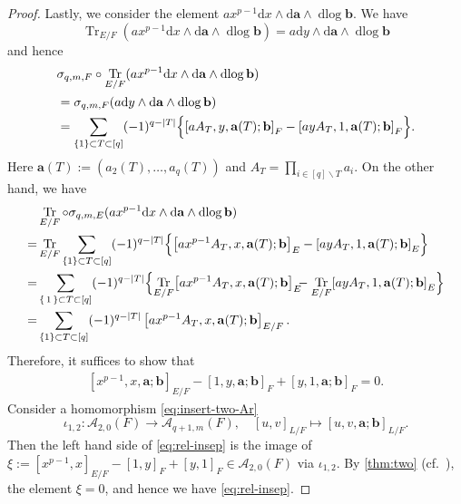 \documentclass[a4paper,12pt,reqno]{amsart}
\numberwithin{equation}{section}
\theoremstyle{definition}
\DeclareMathOperator{\dlog}{dlog}
\DeclareMathOperator{\Tr}{Tr}
\renewcommand{\d}{\mathrm{d}}
\newcommand{\Acal}{\mathcal{A}}
\newcommand{\va}{\mathbf{a}}
\newcommand{\vb}{\mathbf{b}}
\begin{document}
\begin{proof}
    Lastly, we consider the element $ax^{p-1}\d x\wedge \d \va\wedge\dlog\vb$.
    We have 
    \[
    \Tr_{E/F}(ax^{p-1}\d x\wedge \d \va\wedge\dlog\vb)=a\d y\wedge \d \va\wedge\dlog\vb
    \]
    and hence
    \begin{align}
        &\sigma_{q,m,F}\circ \Tr_{E/F}(ax^{p-1}\d x\wedge \d \va\wedge\dlog\vb)
        \\&=\sigma_{q,m,F}(a\d y\wedge \d \va\wedge\dlog\vb)\\
        &=\sum_{\{1\}\subset T\subset[q]}(-1)^{q-|T|}\Bigl\{
        \left[
        aA_T%
        ,y,\va(T);\vb
        \right]_F
        -
        \left[
        ayA_T%
        ,1,\va(T);\vb
        \right]_F 
         \Bigr\}.
    \end{align}
    Here $\va(T):=(a_2(T),\ldots,a_q(T))$ and $A_T=\prod_{i\in [q]\smallsetminus T}a_i$. 
    On the other hand, we have
    \begin{align}
        &\Tr_{E/F}\circ  \sigma_{q,m,E}(ax^{p-1}\d x \wedge \d\va \wedge \dlog \vb)\\
        =&\Tr_{E/F}\sum_{\{1\}\subset T\subset[q]}(-1)^{q-|T|}\Bigl\{
        \left[
        ax^{p-1}A_T%
        ,x,\va(T);\vb
        \right]_E 
        -
        \left[
        ayA_T%
        ,1,\va(T);\vb
        \right]_E 
         \Bigr\}\\
        =&\sum_{\set{1}\subset T\subset[q]}(-1)^{q-|T|}\Bigl\{
        \Tr_{E/F}\!\left[
        ax^{p-1}A_T%
        ,x,\va(T);\vb
        \right]_E\!\!\! 
        -
        \Tr_{E/F}\!\left[
        ayA_T%
        ,1,\va(T);\vb
        \right]_E 
         \Bigr\}\\
        =&\sum_{\{1\}\subset T\subset[q]}(-1)^{q-|T|}
        \left[
        ax^{p-1}A_T%
        ,x,\va(T);\vb
        \right]_{E/F}.
    \end{align}
    Therefore, it suffices to show that
    \begin{align}\label{eq:rel-insep}        
    [x^{p-1},x,\va;\vb]_{E/F}-[1,y,\va;\vb]_F+[y,1,\va;\vb]_F=0.
    \end{align}
    Consider a homomorphism \eqref{eq:insert-two-Ar}
    \[
    \iota_{1,2}:\Acal_{2,0}(F)\to \Acal_{q+1,m}(F),\quad [u,v]_{L/F} \mapsto
    [u,v,\va;\vb]_{L/F}.
    \]
    Then the left hand side of \eqref{eq:rel-insep} is the image of $\xi:=[x^{p-1},x]_{E/F}-[1,y]_F+[y,1]_F\in \Acal_{2,0}(F)$ via $\iota_{1,2}$.
    By \autoref{thm:two} (cf.~\cite[Proof of Proposition~5.13]{RSY22}), the element $\xi=0$, and hence we have \eqref{eq:rel-insep}.


\end{proof}
\end{document}
